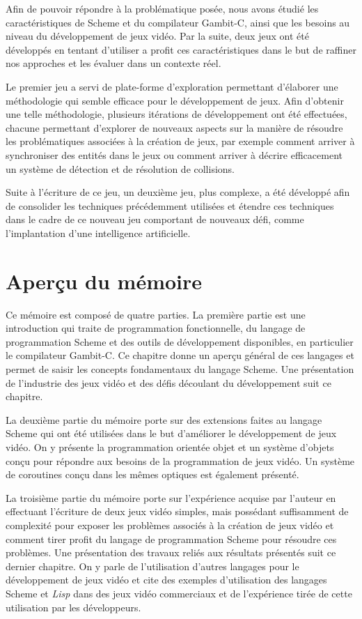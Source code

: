 \documentclass[12pt,oneside,letterpaper,francais]{book}
\newcommand{\lisp}{{\textit{Lisp }}}
\begin{document}
Afin de pouvoir répondre à la problématique posée, nous avons étudié
les caractéristiques de Scheme et du compilateur Gambit-C, ainsi que
les besoins au niveau du développement de jeux vidéo. Par la suite,
deux jeux ont été développés en tentant d'utiliser a profit ces
caractéristiques dans le but de raffiner nos approches et les évaluer
dans un contexte réel.

Le premier jeu a servi de plate-forme d'exploration permettant
d'élaborer une méthodologie qui semble efficace pour le développement
de jeux. Afin d'obtenir une telle méthodologie, plusieurs itérations
de développement ont été effectuées, chacune permettant d'explorer de
nouveaux aspects sur la manière de résoudre les problématiques
associées à la création de jeux, par exemple comment arriver à
synchroniser des entités dans le jeux ou comment arriver à décrire
efficacement un système de détection et de résolution de collisions.

Suite à l'écriture de ce jeu, un deuxième jeu, plus complexe, a été
développé afin de consolider les techniques précédemment utilisées et
étendre ces techniques dans le cadre de ce nouveau jeu comportant de
nouveaux défi, comme l'implantation d'une intelligence artificielle.



\section{Aperçu du mémoire}
Ce mémoire est composé de quatre parties. La première partie est une
introduction qui traite de programmation fonctionnelle, du langage de
programmation Scheme et des outils de développement disponibles, en
particulier le compilateur Gambit-C. Ce chapitre donne un aperçu
général de ces langages et permet de saisir les concepts fondamentaux
du langage Scheme. Une présentation de l'industrie des jeux vidéo et
des défis découlant du développement suit ce chapitre.

La deuxième partie du mémoire porte sur des extensions faites au
langage Scheme qui ont été utilisées dans le but d'améliorer le
développement de jeux vidéo. On y présente la programmation orientée
objet et un système d'objets conçu pour répondre aux besoins de la
programmation de jeux vidéo. Un système de coroutines conçu dans les
mêmes optiques est également présenté.

La troisième partie du mémoire porte sur l'expérience acquise par
l'auteur en effectuant l'écriture de deux jeux vidéo simples, mais
possédant suffisamment de complexité pour exposer les problèmes
associés à la création de jeux vidéo et comment tirer profit du
langage de programmation Scheme pour résoudre ces problèmes. Une
présentation des travaux reliés aux résultats présentés suit ce
dernier chapitre. On y parle de l'utilisation d'autres langages pour
le développement de jeux vidéo et cite des exemples d'utilisation des
langages Scheme et \lisp dans des jeux vidéo commerciaux et de
l'expérience tirée de cette utilisation par les développeurs.
\end{document}
